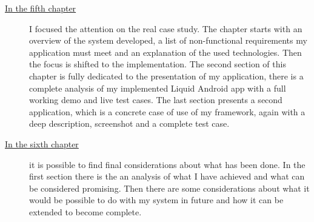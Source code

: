 \begin{description}
\item[{\hyperref[cap:proofofconcept]{In the fifth chapter}}] I focused the attention on the real case study. The chapter starts with an overview of the system developed, a list of non-functional requirements my application must meet and an explanation of the used technologies. Then the focus is shifted to the implementation. The second section of this chapter is fully dedicated to the presentation of my application, there is a complete analysis of my implemented Liquid Android app with a full working demo and live test cases. The last section presents a second application, which is a concrete case of use of my framework, again with a deep description, screenshot and a complete test case.

\item[{\hyperref[cap:conclusions]{In the sixth chapter}}]it is possible to find final considerations about what has been done. In the first section there is the an analysis of what I have achieved and what can be considered promising. Then there are some considerations about what it would be possible to do with my system in future and how it can be extended to become complete.
%
\end{description}
%
